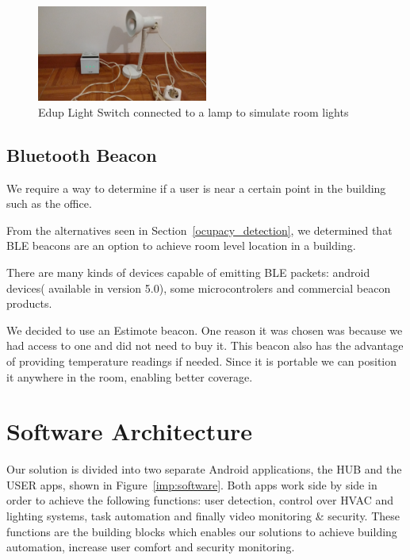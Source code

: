 \begin{figure}[htbp]
\centering
\includegraphics[width=0.5\textwidth]{Figures/imp_light_switch_light}
\caption{Edup Light Switch connected to a lamp to simulate room lights}
\label{imp_light_switch_light}
\end{figure}



\subsection{Bluetooth Beacon}

We require a way to determine if a user is near a certain point in the building such as the office.

From the alternatives seen in Section~\ref{ocupacy_detection}, we  determined that \ac{BLE} beacons are an option to achieve room level location in a building.

There are many kinds of devices capable of emitting \ac{BLE} packets: android devices( available in version 5.0), some microcontrolers and commercial beacon products.

We decided to use an Estimote beacon. One reason it was chosen was because we had access to one and did not need to buy it. This beacon also has the advantage of providing temperature readings if needed. Since it is portable we can position it anywhere in the room, enabling better coverage.


\section{Software Architecture}


Our solution is divided into two separate Android applications, the HUB and the USER apps, shown in Figure~\ref{imp:software}. Both apps work side by side in order to achieve the following functions: user detection, control over \ac{HVAC} and lighting systems, task automation and finally video monitoring \& security. These functions are the building blocks which enables our solutions to achieve building automation, increase user comfort and security monitoring.

